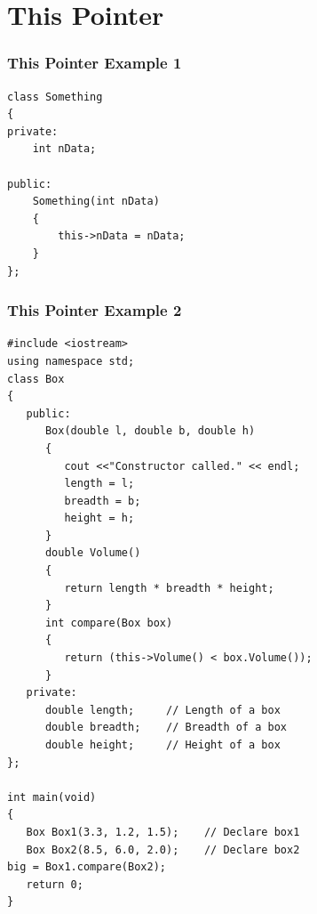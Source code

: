 \documentclass{beamer}
\newtheorem{Key points}{Key points}
\newcommand\Fontvi{\fontsize{5}{6.2}\selectfont}
\begin{document}
\section{This Pointer}
\begin{frame}[fragile]
\frametitle{This Pointer Example 1}
\begin{lstlisting}
class Something
{
private:
    int nData;
 
public:
    Something(int nData)
    {
        this->nData = nData;
    }
};
\end{lstlisting}
\end{frame}
\begin{frame}[fragile]
\frametitle{This Pointer Example 2}
\Fontvi
\begin{lstlisting}
#include <iostream>
using namespace std;
class Box
{
   public:
      Box(double l, double b, double h)
      {
         cout <<"Constructor called." << endl;
         length = l;
         breadth = b;
         height = h;
      }
      double Volume()
      {
         return length * breadth * height;
      }
      int compare(Box box)
      {
         return (this->Volume() < box.Volume());
      }
   private:
      double length;     // Length of a box
      double breadth;    // Breadth of a box
      double height;     // Height of a box
};

int main(void)
{
   Box Box1(3.3, 1.2, 1.5);    // Declare box1
   Box Box2(8.5, 6.0, 2.0);    // Declare box2
big = Box1.compare(Box2);
   return 0;
}
\end{lstlisting}
\end{frame}
\end{document}
